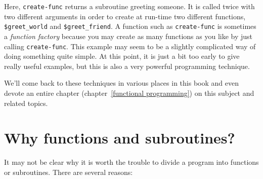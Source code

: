 Here, \verb"create-func" returns a subroutine greeting someone. 
It is called twice with two different arguments in order to 
create at run-time two different functions, \verb"$greet_world" and 
\verb"$greet_friend". A function such as \verb"create-func" 
is sometimes a \emph{function factory} because you may create as many 
functions as you like by just calling \verb"create-func". This 
example may seem to be a slightly complicated way of doing 
something quite simple. At this point, it is 
just a bit too early to give really useful examples, but 
this is also a very powerful programming technique.  

We'll come back to these techniques in various places in this 
book and even devote an entire chapter (chapter~\ref{functional 
programming}) on this subject and related topics.


\section{Why functions and subroutines?}

It may not be clear why it is worth the trouble to divide
a program into functions or subroutines.  There are 
several reasons:

